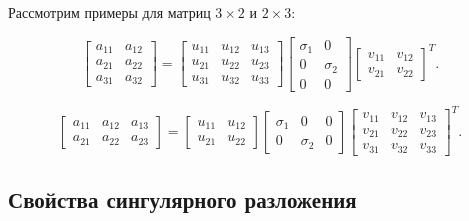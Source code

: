 \documentclass[12pt]{article}
\begin{document}
		Рассмотрим примеры для матриц $3 \times 2$ и $2 \times 3$:
		
		\begin{equation}
			\begin{bmatrix}
				a_{11} & a_{12} \\
				a_{21} & a_{22} \\
				a_{31} & a_{32}
			\end{bmatrix}
			=
			\begin{bmatrix}
				u_{11} & u_{12} & u_{13} \\
				u_{21} & u_{22} & u_{23} \\
				u_{31} & u_{32} & u_{33}
			\end{bmatrix}
			\begin{bmatrix}
				\sigma_{1} & 0 \\
				0 & \sigma_{2} \\
				0 & 0
			\end{bmatrix}
			\begin{bmatrix}
				v_{11} & v_{12} \\
				v_{21} & v_{22}
			\end{bmatrix}^{T}.
		\end{equation}
		
		\begin{equation}
			\begin{bmatrix}
				a_{11} & a_{12} & a_{13} \\
				a_{21} & a_{22} & a_{23}
			\end{bmatrix}
			=
			\begin{bmatrix}
				u_{11} & u_{12} \\
				u_{21} & u_{22}
			\end{bmatrix}
			\begin{bmatrix}
				\sigma_{1} & 0 & 0 \\
				0 & \sigma_{2} & 0
			\end{bmatrix}
			\begin{bmatrix}
				v_{11} & v_{12} & v_{13} \\
				v_{21} & v_{22} & v_{23} \\
				v_{31} & v_{32} & v_{33}
			\end{bmatrix}^{T}.
		\end{equation}
	
	\subsection*{Свойства сингулярного разложения}
	
\end{document}
